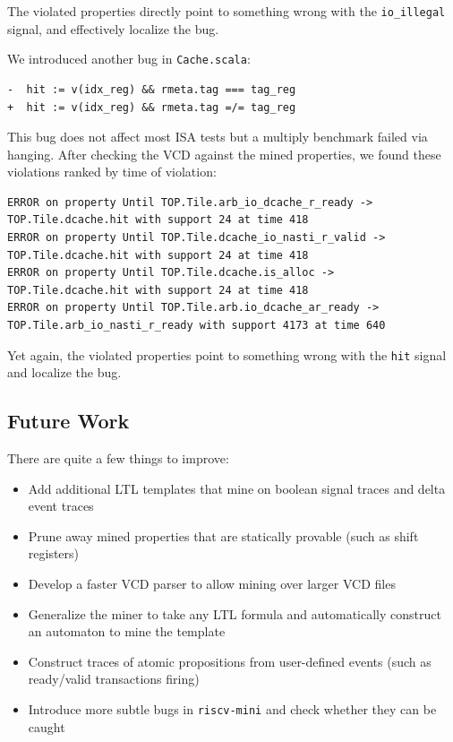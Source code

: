 \documentclass[acmlarge,11pt]{acmart}
\begin{document}
The violated properties directly point to something wrong with the \texttt{io\_illegal} signal, and effectively localize the bug.

We introduced another bug in \texttt{Cache.scala}:
\begin{verbatim}
-  hit := v(idx_reg) && rmeta.tag === tag_reg
+  hit := v(idx_reg) && rmeta.tag =/= tag_reg
\end{verbatim}

This bug does not affect most ISA tests but a multiply benchmark failed via hanging.
After checking the VCD against the mined properties, we found these violations ranked by time of violation:
\begin{verbatim}
ERROR on property Until TOP.Tile.arb_io_dcache_r_ready -> TOP.Tile.dcache.hit with support 24 at time 418
ERROR on property Until TOP.Tile.dcache_io_nasti_r_valid -> TOP.Tile.dcache.hit with support 24 at time 418
ERROR on property Until TOP.Tile.dcache.is_alloc -> TOP.Tile.dcache.hit with support 24 at time 418
ERROR on property Until TOP.Tile.arb.io_dcache_ar_ready -> TOP.Tile.arb_io_nasti_r_ready with support 4173 at time 640
\end{verbatim}

Yet again, the violated properties point to something wrong with the \texttt{hit} signal and localize the bug.

\subsection{Future Work}
There are quite a few things to improve:
\begin{itemize}
  \item Add additional LTL templates that mine on boolean signal traces and delta event traces
  \item Prune away mined properties that are statically provable (such as shift registers)
  \item Develop a faster VCD parser to allow mining over larger VCD files
  \item Generalize the miner to take any LTL formula and automatically construct an automaton to mine the template
  \item Construct traces of atomic propositions from user-defined events (such as ready/valid transactions firing)
  \item Introduce more subtle bugs in \texttt{riscv-mini} and check whether they can be caught
\end{itemize}
\end{document}
